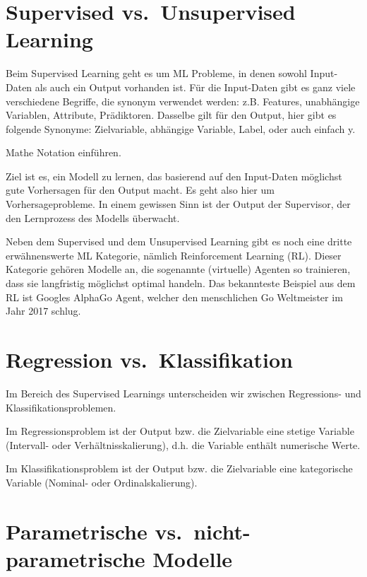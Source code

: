 \documentclass[
]{book}
\begin{document}
\hypertarget{supervised-vs.-unsupervised-learning}{%
\section{Supervised vs.~Unsupervised Learning}\label{supervised-vs.-unsupervised-learning}}

Beim Supervised Learning geht es um ML Probleme, in denen sowohl Input-Daten als auch ein Output vorhanden ist. Für die Input-Daten gibt es ganz viele verschiedene Begriffe, die synonym verwendet werden: z.B. Features, unabhängige Variablen, Attribute, Prädiktoren. Dasselbe gilt für den Output, hier gibt es folgende Synonyme: Zielvariable, abhängige Variable, Label, oder auch einfach y.

Mathe Notation einführen.

Ziel ist es, ein Modell zu lernen, das basierend auf den Input-Daten möglichst gute Vorhersagen für den Output macht. Es geht also hier um Vorhersageprobleme. In einem gewissen Sinn ist der Output der Supervisor, der den Lernprozess des Modells überwacht.

Neben dem Supervised und dem Unsupervised Learning gibt es noch eine dritte erwähnenswerte ML Kategorie, nämlich Reinforcement Learning (RL). Dieser Kategorie gehören Modelle an, die sogenannte (virtuelle) Agenten so trainieren, dass sie langfristig möglichst optimal handeln. Das bekannteste Beispiel aus dem RL ist Googles AlphaGo Agent, welcher den menschlichen Go Weltmeister im Jahr 2017 schlug.

\hypertarget{regression-vs.-klassifikation}{%
\section{Regression vs.~Klassifikation}\label{regression-vs.-klassifikation}}

Im Bereich des Supervised Learnings unterscheiden wir zwischen Regressions- und Klassifikationsproblemen.

Im Regressionsproblem ist der Output bzw. die Zielvariable eine stetige Variable (Intervall- oder Verhältnisskalierung), d.h. die Variable enthält numerische Werte.

Im Klassifikationsproblem ist der Output bzw. die Zielvariable eine kategorische Variable (Nominal- oder Ordinalskalierung).

\hypertarget{parametrische-vs.-nicht-parametrische-modelle}{%
\section{Parametrische vs.~nicht-parametrische Modelle}\label{parametrische-vs.-nicht-parametrische-modelle}}
\end{document}
